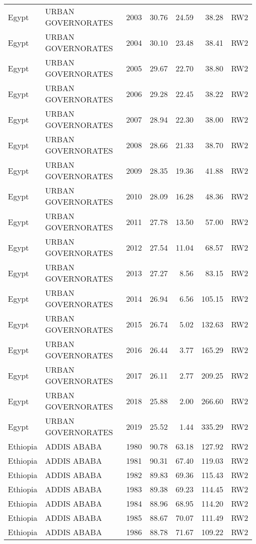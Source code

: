 \begin{longtable}{lllrrrl}
  Egypt & URBAN GOVERNORATES & 2003 & 30.76 & 24.59 & 38.28 & RW2 \\ 
  Egypt & URBAN GOVERNORATES & 2004 & 30.10 & 23.48 & 38.41 & RW2 \\ 
  Egypt & URBAN GOVERNORATES & 2005 & 29.67 & 22.70 & 38.80 & RW2 \\ 
  Egypt & URBAN GOVERNORATES & 2006 & 29.28 & 22.45 & 38.22 & RW2 \\ 
  Egypt & URBAN GOVERNORATES & 2007 & 28.94 & 22.30 & 38.00 & RW2 \\ 
  Egypt & URBAN GOVERNORATES & 2008 & 28.66 & 21.33 & 38.70 & RW2 \\ 
  Egypt & URBAN GOVERNORATES & 2009 & 28.35 & 19.36 & 41.88 & RW2 \\ 
  Egypt & URBAN GOVERNORATES & 2010 & 28.09 & 16.28 & 48.36 & RW2 \\ 
  Egypt & URBAN GOVERNORATES & 2011 & 27.78 & 13.50 & 57.00 & RW2 \\ 
  Egypt & URBAN GOVERNORATES & 2012 & 27.54 & 11.04 & 68.57 & RW2 \\ 
  Egypt & URBAN GOVERNORATES & 2013 & 27.27 & 8.56 & 83.15 & RW2 \\ 
  Egypt & URBAN GOVERNORATES & 2014 & 26.94 & 6.56 & 105.15 & RW2 \\ 
  Egypt & URBAN GOVERNORATES & 2015 & 26.74 & 5.02 & 132.63 & RW2 \\ 
  Egypt & URBAN GOVERNORATES & 2016 & 26.44 & 3.77 & 165.29 & RW2 \\ 
  Egypt & URBAN GOVERNORATES & 2017 & 26.11 & 2.77 & 209.25 & RW2 \\ 
  Egypt & URBAN GOVERNORATES & 2018 & 25.88 & 2.00 & 266.60 & RW2 \\ 
  Egypt & URBAN GOVERNORATES & 2019 & 25.52 & 1.44 & 335.29 & RW2 \\ 
  Ethiopia & ADDIS ABABA & 1980 & 90.78 & 63.18 & 127.92 & RW2 \\ 
  Ethiopia & ADDIS ABABA & 1981 & 90.31 & 67.40 & 119.03 & RW2 \\ 
  Ethiopia & ADDIS ABABA & 1982 & 89.83 & 69.36 & 115.43 & RW2 \\ 
  Ethiopia & ADDIS ABABA & 1983 & 89.38 & 69.23 & 114.45 & RW2 \\ 
  Ethiopia & ADDIS ABABA & 1984 & 88.96 & 68.95 & 114.20 & RW2 \\ 
  Ethiopia & ADDIS ABABA & 1985 & 88.67 & 70.07 & 111.49 & RW2 \\ 
  Ethiopia & ADDIS ABABA & 1986 & 88.78 & 71.67 & 109.22 & RW2 \\ 

\end{longtable}
